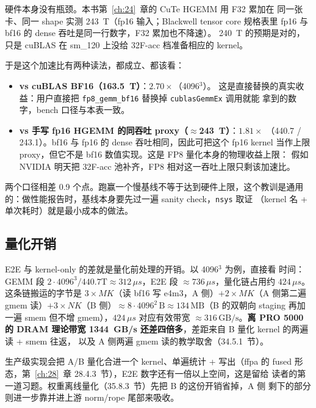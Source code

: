 硬件本身没有瓶颈。本书第~\ref{ch:24}~章的 CuTe HGEMM 用 F32 累加在
同一张卡、同一 shape 实测 243~T（fp16 输入；Blackwell tensor core
规格表里 fp16 与 bf16 的 dense 吞吐是同一行数字，F32 累加也不降速）。
240~T 的预期是对的，只是 cuBLAS 在 sm\_120 上没给 32F-acc
档准备相应的 kernel。

于是这个加速比有两种读法，都成立、都该看：

\begin{itemize}[itemsep=1pt,topsep=2pt]
  \item \textbf{vs cuBLAS BF16（163.5~T）}：$2.70\times$（4096$^3$）。
        这是直接替换的真实收益：用户直接把
        \texttt{fp8\_gemm\_bf16} 替换掉 \texttt{cublasGemmEx} 调用就能
        拿到的数字，bench 口径与本表一致。
  \item \textbf{vs 手写 fp16 HGEMM 的同吞吐 proxy（$\approx$243~T）}：$1.81\times$
        （440.7 / 243.1）。bf16 与 fp16 的 dense 吞吐相同，因此可把这个 fp16
        kernel 当作上限 proxy，但它不是 bf16 数值实现。这是 FP8 量化本身的物理收益上限：
        假如 NVIDIA 明天把 32F-acc 池补齐，FP8 相对这一吞吐上限只剩该加速比。
\end{itemize}

两个口径相差 0.9 个点。跑赢一个慢基线不等于达到硬件上限，这个教训是通用
的：做性能报告时，基线本身要先过一遍 sanity check，\texttt{nsys} 取证
（kernel 名 + 单次耗时）就是最小成本的做法。

\subsection{量化开销}

E2E 与 kernel-only 的差就是量化前处理的开销。以 4096$^3$ 为例，直接看
时间：GEMM 段
$2\cdot4096^3/440.7\mathrm{T}\approx 312\,\mu s$，E2E 段
$\approx 736\,\mu s$，量化链占用约 $424\,\mu s$。这条链搬运的字节是
$3\times MK$（读 bf16 写 e4m3，A 侧）$+2\times MK$（A 侧第二遍 gmem 读）$+3\times NK$（B 侧）$\approx
8\cdot 4096^2\,\text{B}\approx 134\,\text{MB}$（B 的双朝向 staging 再加
一遍 smem 但不增 gmem），$424\,\mu s$ 对应有效带宽
$\approx 316\,\text{GB/s}$。\textbf{离 PRO 5000 的 DRAM 理论带宽
1344~GB/s 还差四倍多}，差距来自 B 量化 kernel 的两遍读 + smem 往返，
以及 A 侧两遍 gmem 读的教学取舍（34.5.1~节）。

生产级实现会把 A/B 量化合进一个 kernel、单遍统计 + 写出（ffpa 的 fused
形态，第~\ref{ch:28}~章 28.4.3~节），E2E 数字还有一倍以上空间，这是留给
读者的第一道习题。权重离线量化（35.8.3~节）先把 B 的这份开销省掉，A 侧
剩下的部分则进一步靠并进上游 norm/rope 尾部来吸收。


